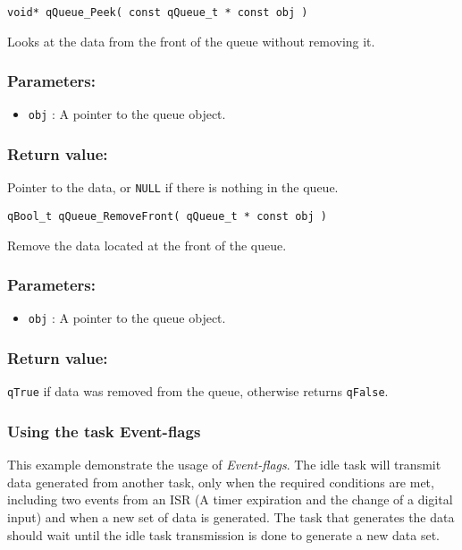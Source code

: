 \begin{lstlisting}[style=CStyle]
void* qQueue_Peek( const qQueue_t * const obj )
\end{lstlisting}

Looks at the data from the front of the queue without removing it.   

\subsubsection*{Parameters:}
\begin{itemize}
    \item \lstinline{obj} : A pointer to the queue object.
\end{itemize}

\subsubsection*{Return value:}
Pointer to the data, or \lstinline{NULL} if there is nothing in the queue.

\noindent\hrulefill


\begin{lstlisting}[style=CStyle]
qBool_t qQueue_RemoveFront( qQueue_t * const obj )
\end{lstlisting}

Remove the data located at the front of the queue. 

\subsubsection*{Parameters:}
\begin{itemize}
    \item \lstinline{obj} : A pointer to the queue object.
\end{itemize}

\subsubsection*{Return value:}
\lstinline{qTrue} if data was removed from the queue, otherwise returns \lstinline{qFalse}.

\subsubsection{Using the task Event-flags}
This example demonstrate the usage of \textit{Event-flags}. The idle task will transmit data generated from another task, only when the required conditions are met, including two events from an ISR (A timer expiration and the change of a digital input) and when a new set of data is generated.
The task that generates the data should wait until the idle task transmission is done to generate a new data set. 
\medskip

